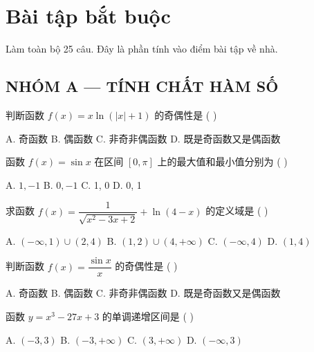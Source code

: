 \documentclass[11pt, a4paper]{article}
\begin{document}

\section{Bài tập bắt buộc}

Làm toàn bộ 25 câu. Đây là phần tính vào điểm bài tập về nhà.

\subsection*{NHÓM A — TÍNH CHẤT HÀM SỐ}

\begin{baitap}[1]
判断函数 $f(x) = x\ln(|x| + 1)$ 的奇偶性是 ( )
\par\vspace{3pt}
\noindent A. 奇函数 \quad B. 偶函数 \quad C. 非奇非偶函数 \quad D. 既是奇函数又是偶函数
\end{baitap}

\begin{baitap}[2]
函数 $f(x) = \sin x$ 在区间 $[0, \pi]$ 上的最大值和最小值分别为 ( )
\par\vspace{3pt}
\noindent A. $1, -1$ \quad B. $0, -1$ \quad C. 1, 0 \quad D. 0, 1
\end{baitap}

\begin{baitap}[3]
求函数 $f(x) = \dfrac{1}{\sqrt{x^2 - 3x + 2}} + \ln(4 - x)$ 的定义域是 ( )
\par\vspace{3pt}
\noindent A. $(-\infty, 1) \cup (2,4)$ \quad B. $(1,2) \cup (4, +\infty)$ \quad C. $(-\infty, 4)$ \quad D. $(1,4)$
\end{baitap}

\begin{baitap}[4]
判断函数 $f(x) = \dfrac{\sin x}{x}$ 的奇偶性是 ( )
\par\vspace{3pt}
\noindent A. 奇函数 \quad B. 偶函数 \quad C. 非奇非偶函数 \quad D. 既是奇函数又是偶函数
\end{baitap}

\begin{baitap}[5]
函数 $y = x^3 - 27x + 3$ 的单调递增区间是 ( )
\par\vspace{3pt}
\noindent A. $(-3,3)$ \quad B. $(-3, +\infty)$ \quad C. $(3, +\infty)$ \quad D. $(-\infty, 3)$
\end{baitap}
\end{document}
